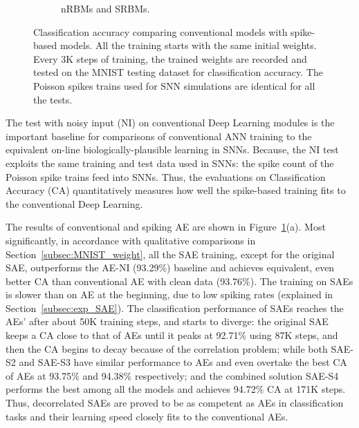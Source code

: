 \begin{figure}
\begin{subfigure}[t]{0.8\textwidth}
		\caption{nRBMs and SRBMs.}
	\end{subfigure}
	\caption[Classification accuracy comparisons of conventional models with spike-based models.]{Classification accuracy comparing conventional models with spike-based models. All the training starts with the same initial weights. Every 3K steps of training, the trained weights are recorded and tested on the MNIST testing dataset for classification accuracy. The Poisson spikes trains used for SNN simulations are identical for all the tests.}
	\label{fig:sdlm_ca}
\end{figure}

The test with noisy input (NI) on conventional Deep Learning modules is the important baseline for comparisons of conventional ANN training to the equivalent on-line biologically-plausible learning in SNNs.
Because, the NI test exploits the same training and test data used in SNNs: the spike count of the Poisson spike trains feed into SNNs.
Thus, the evaluations on Classification Accuracy (CA) quantitatively measures how well the spike-based training fits to the conventional Deep Learning.


The results of conventional and spiking AE are shown in Figure~\ref{fig:sdlm_ca}(a).
Most significantly, in accordance with qualitative comparisons in Section~\ref{subsec:MNIST_weight}, all the SAE training, except for the original SAE, outperforms the AE-NI (93.29\%) baseline and achieves equivalent, even better CA than conventional AE with clean data (93.76\%).
The training on SAEs is slower than on AE at the beginning, due to low spiking rates (explained in Section~\ref{subsec:exp_SAE}).
The classification performance of SAEs reaches the AEs' after about 50K training steps, and starts to diverge:
the original SAE keeps a CA close to that of AEs until it peaks at 92.71\% using 87K steps, and then the CA begins to decay because of the correlation problem;
while both SAE-S2 and SAE-S3 have similar performance to AEs and even overtake the best CA of AEs at 93.75\% and 94.38\% respectively;
and the combined solution SAE-S4 performs the best among all the models and achieves 94.72\% CA at 171K steps.
Thus, decorrelated SAEs are proved to be as competent as AEs in classification tasks and their learning speed closely fits to the conventional AEs.

